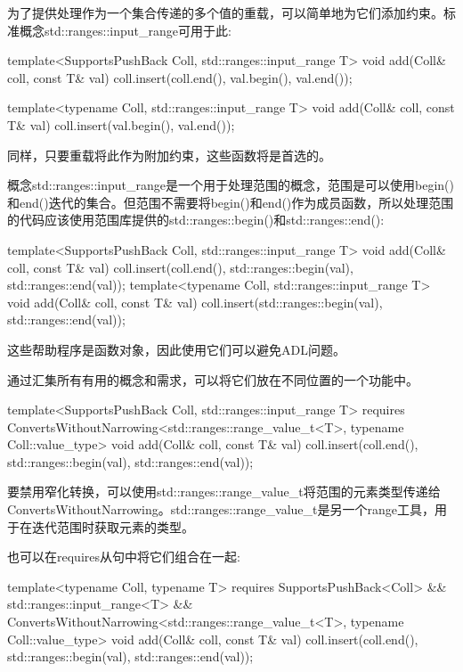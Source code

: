 为了提供处理作为一个集合传递的多个值的重载，可以简单地为它们添加约束。标准概念std::ranges::input\_range可用于此:

\begin{cpp}
template<SupportsPushBack Coll, std::ranges::input_range T>
void add(Coll& coll, const T& val)
{
	coll.insert(coll.end(), val.begin(), val.end());
}

template<typename Coll, std::ranges::input_range T>
void add(Coll& coll, const T& val)
{
	coll.insert(val.begin(), val.end());
}
\end{cpp}

同样，只要重载将此作为附加约束，这些函数将是首选的。

概念std::ranges::input\_range是一个用于处理范围的概念，范围是可以使用begin()和end()迭代的集合。但范围不需要将begin()和end()作为成员函数，所以处理范围的代码应该使用范围库提供的std::ranges::begin()和std::ranges::end():

\begin{cpp}
template<SupportsPushBack Coll, std::ranges::input_range T>
void add(Coll& coll, const T& val)
{
	coll.insert(coll.end(), std::ranges::begin(val), std::ranges::end(val));
}
template<typename Coll, std::ranges::input_range T>
void add(Coll& coll, const T& val)
{
	coll.insert(std::ranges::begin(val), std::ranges::end(val));
}
\end{cpp}

这些帮助程序是函数对象，因此使用它们可以避免ADL问题。


通过汇集所有有用的概念和需求，可以将它们放在不同位置的一个功能中。

\begin{cpp}
template<SupportsPushBack Coll, std::ranges::input_range T>
requires ConvertsWithoutNarrowing<std::ranges::range_value_t<T>,
typename Coll::value_type>
void add(Coll& coll, const T& val)
{
	coll.insert(coll.end(),
				std::ranges::begin(val), std::ranges::end(val));
}
\end{cpp}

要禁用窄化转换，可以使用std::ranges::range\_value\_t将范围的元素类型传递给ConvertsWithoutNarrowing。std::ranges::range\_value\_t是另一个range工具，用于在迭代范围时获取元素的类型。

也可以在requires从句中将它们组合在一起:

\begin{cpp}
template<typename Coll, typename T>
requires SupportsPushBack<Coll> &&
			std::ranges::input_range<T> &&
			ConvertsWithoutNarrowing<std::ranges::range_value_t<T>,
							typename Coll::value_type>
void add(Coll& coll, const T& val)
{
	coll.insert(coll.end(),
				std::ranges::begin(val), std::ranges::end(val));
}
\end{cpp}

